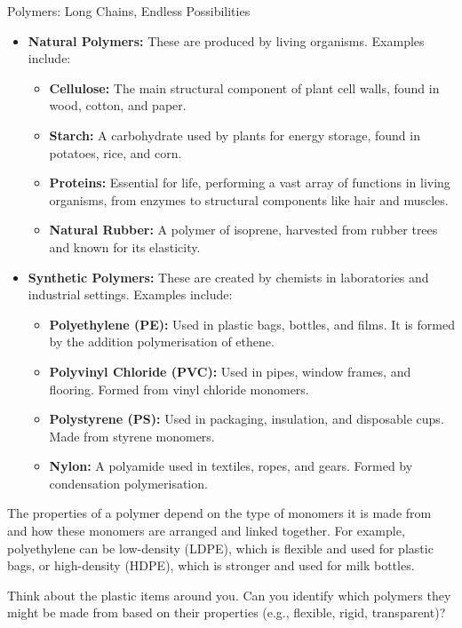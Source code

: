 \begin{keyconcept}{Polymers: Long Chains, Endless Possibilities}
\begin{itemize}
    \item \textbf{Natural Polymers:} These are produced by living organisms. Examples include:
    \begin{itemize}
        \item \textbf{Cellulose:}  The main structural component of plant cell walls, found in wood, cotton, and paper.
        \item \textbf{Starch:}  A carbohydrate used by plants for energy storage, found in potatoes, rice, and corn.
        \item \textbf{Proteins:}  Essential for life, performing a vast array of functions in living organisms, from enzymes to structural components like hair and muscles.
        \item \textbf{Natural Rubber:}  A polymer of isoprene, harvested from rubber trees and known for its elasticity.
    \end{itemize}
    \item \textbf{Synthetic Polymers:} These are created by chemists in laboratories and industrial settings. Examples include:
    \begin{itemize}
        \item \textbf{Polyethylene (PE):}  Used in plastic bags, bottles, and films. It is formed by the addition polymerisation of ethene.
        \item \textbf{Polyvinyl Chloride (PVC):}  Used in pipes, window frames, and flooring.  Formed from vinyl chloride monomers.
        \item \textbf{Polystyrene (PS):}  Used in packaging, insulation, and disposable cups. Made from styrene monomers.
        \item \textbf{Nylon:}  A polyamide used in textiles, ropes, and gears.  Formed by condensation polymerisation.
    \end{itemize}
\end{itemize}

The properties of a polymer depend on the type of monomers it is made from and how these monomers are arranged and linked together. For example, polyethylene can be low-density (LDPE), which is flexible and used for plastic bags, or high-density (HDPE), which is stronger and used for milk bottles.
\end{keyconcept}

\begin{stopandthink}
Think about the plastic items around you. Can you identify which polymers they might be made from based on their properties (e.g., flexible, rigid, transparent)?
\end{stopandthink}

